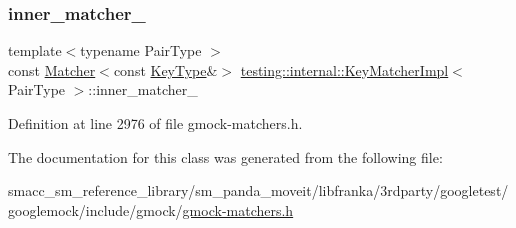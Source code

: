 \subsubsection{\texorpdfstring{inner\+\_\+matcher\+\_\+}{inner\_matcher\_}}
{\footnotesize\ttfamily template$<$typename Pair\+Type $>$ \\
const \hyperlink{classtesting_1_1Matcher}{Matcher}$<$const \hyperlink{classtesting_1_1internal_1_1KeyMatcherImpl_a9bd63b699518bd9868ba24766547667a}{Key\+Type}\&$>$ \hyperlink{classtesting_1_1internal_1_1KeyMatcherImpl}{testing\+::internal\+::\+Key\+Matcher\+Impl}$<$ Pair\+Type $>$\+::inner\+\_\+matcher\+\_\+\hspace{0.3cm}{\ttfamily [private]}}



Definition at line 2976 of file gmock-\/matchers.\+h.



The documentation for this class was generated from the following file\+:\begin{DoxyCompactItemize}
\item 
smacc\+\_\+sm\+\_\+reference\+\_\+library/sm\+\_\+panda\+\_\+moveit/libfranka/3rdparty/googletest/googlemock/include/gmock/\hyperlink{gmock-matchers_8h}{gmock-\/matchers.\+h}\end{DoxyCompactItemize}
